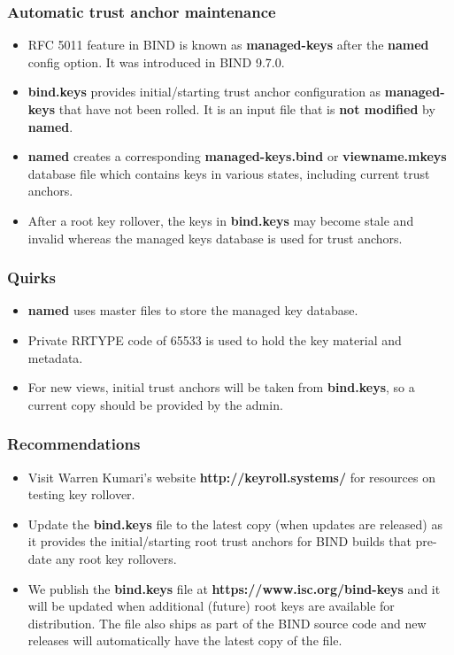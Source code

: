 \documentclass{beamer}
\begin{document}
\frame
{
  \frametitle{Automatic trust anchor maintenance}

  \begin{itemize}

  \item RFC 5011 feature in BIND is known as \textbf{managed-keys} after
    the \textbf{named} config option. It was introduced in BIND 9.7.0.

  \item \textbf{bind.keys} provides initial/starting trust anchor
    configuration as \textbf{managed-keys} that have not been rolled. It
    is an input file that is \textbf{not modified} by \textbf{named}.

  \item \textbf{named} creates a corresponding
    \textbf{managed-keys.bind} or \textbf{viewname.mkeys} database file
    which contains keys in various states, including current trust
    anchors.

  \item After a root key rollover, the keys in \textbf{bind.keys} may
    become stale and invalid whereas the managed keys database is used
    for trust anchors.

  \end{itemize}
}

\frame
{
  \frametitle{Quirks}

  \begin{itemize}
    \item \textbf{named} uses master files to store the managed key
      database.
    \item Private RRTYPE code of 65533 is used to hold the key material
      and metadata.
    \item For new views, initial trust anchors will be taken from
      \textbf{bind.keys}, so a current copy should be provided by the
      admin.
  \end{itemize}
}

\frame
{
  \frametitle{Recommendations}

  \begin{itemize}
  \item Visit Warren Kumari's website \textbf{http://keyroll.systems/}
    for resources on testing key rollover.

  \item Update the \textbf{bind.keys} file to the latest copy (when
    updates are released) as it provides the initial/starting root trust
    anchors for BIND builds that pre-date any root key rollovers.

  \item We publish the \textbf{bind.keys} file at
    \textbf{https://www.isc.org/bind-keys} and it will be updated when
    additional (future) root keys are available for distribution. The
    file also ships as part of the BIND source code and new releases
    will automatically have the latest copy of the file.
  \end{itemize}

}
\end{document}
